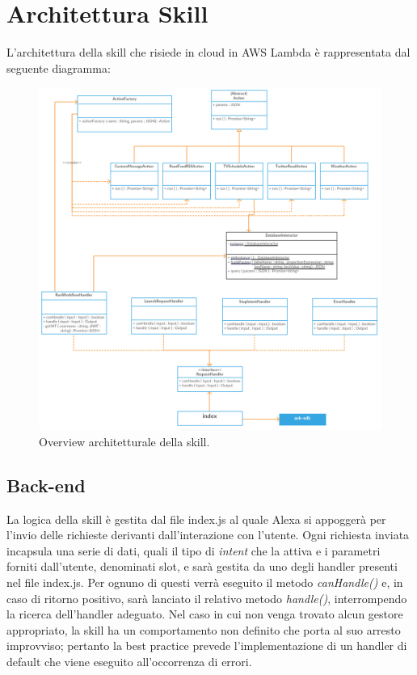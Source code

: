 \pagebreak
\section{Architettura Skill}

L'architettura della skill che risiede in cloud in AWS Lambda è rappresentata dal seguente diagramma:

\begin{figure}[H]
	\begin{center}
		\includegraphics[width=\textwidth, keepaspectratio]{../includes/pics/Skill.png}
		\caption{Overview architetturale della skill.}
	\end{center}
\end{figure}

\subsection{Back-end}
La logica della skill è gestita dal file index.js al quale Alexa si appoggerà per l'invio delle richieste derivanti dall'interazione con l'utente.
Ogni richiesta inviata incapsula una serie di dati, quali il tipo di \textit{intent} che la attiva e i parametri forniti dall'utente, denominati slot, e sarà gestita da uno degli handler presenti nel file index.js.
Per ognuno di questi verrà eseguito il metodo \textit{canHandle()} e, in caso di ritorno positivo, sarà lanciato il relativo metodo \textit{handle()}, interrompendo la ricerca dell'handler adeguato.
Nel caso in cui non venga trovato alcun gestore appropriato, la skill ha un comportamento non definito che porta al suo arresto improvviso; pertanto la best practice prevede l'implementazione di un handler di default che viene eseguito all'occorrenza di errori.


